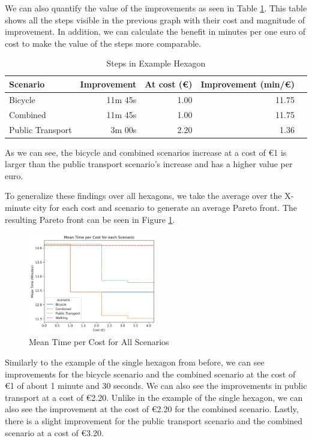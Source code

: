 We can also quantify the value of the improvements as seen in Table \ref{tab:differences_in_example_hexagon}.
This table shows all the steps visible in the previous graph with their cost and magnitude of improvement.
In addition, we can calculate the benefit in minutes per one euro of cost to make the value of the steps more comparable.
\begin{table}
  \caption{Steps in Example Hexagon}
  \label{tab:differences_in_example_hexagon}
  \begin{center}
    \begin{tabular}{|l|r|r|r|l|}
    \hline
     Scenario & Improvement & At cost (\euro) & Improvement (min/\euro) \\
    \hline
     Bicycle & 11m 45s & 1.00 & 11.75 \\
    \hline
     Combined & 11m 45s & 1.00 & 11.75 \\
    \hline
     Public Transport & 3m 00s & 2.20 & 1.36 \\
    \hline
    \end{tabular}
  \end{center}
\end{table}
As we can see, the bicycle and combined scenarios increase at a cost of \euro{1} is larger than the public transport scenario's increase and has a higher value per euro.

To generalize these findings over all hexagons, we take the average over the X-minute city for each cost and scenario to generate an average Pareto front.
The resulting Pareto front can be seen in Figure \ref{fig:mean_time_per_cost}.
\begin{figure}
  \begin{center}
     \includegraphics[width=0.5\textwidth]{Figures/results/metric_cost/mean_time_per_cost}
  \end{center}
  \caption{Mean Time per Cost for All Scenarios}
  \label{fig:mean_time_per_cost}
\end{figure}
Similarly to the example of the single hexagon from before, we can see improvements for the bicycle scenario and the combined scenario at the cost of \euro{1} of about 1 minute and 30 seconds.
We can also see the improvements in public transport at a cost of \euro{2.20}.
Unlike in the example of the single hexagon, we can also see the improvement at the cost of \euro{2.20} for the combined scenario.
Lastly, there is a slight improvement for the public transport scenario and the combined scenario at a cost of \euro{3.20}.

